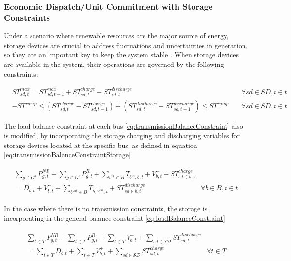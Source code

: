 \documentclass[12pt,LUDisStyle,twosided]{book}
\newcommand{\mc}{\mathcal}
\begin{document}
\subsubsection{Economic Dispatch/Unit Commitment with Storage Constraints}

Under a scenario where renewable resources are the major source of energy, storage devices are crucial to address fluctuations and uncertainties in generation, so they are an important key to keep the system stable \cite{dwyer}. When storage devices are available in the system, their operations are governed by the following constraints:

\begin{subequations}\label{model:storageConstraints}
\begin{alignat}{4}
& ST^{max}_{sd,t} = ST^{max}_{sd,t - 1} + ST^{charge}_{sd,t} - ST^{discharge}_{sd,t}  &~& \forall sd \in SD, t \in t \label{eq:storageLimits} \\
&  -ST^{ramp} \leq (ST^{charge}_{sd,t} - ST^{charge}_{sd,t-1}) + (ST^{discharge}_{sd,t} - ST^{discharge}_{sd,t-1}) \leq ST^{ramp}  &~& \forall sd \in SD, t \in t \label{eq:storageRamping}
\end{alignat} 
\end{subequations}

The load balance constraint at each bus \ref{eq:transmissionBalanceConstraint} also is modified, by incorporating the storage charging and discharging variables for storage devices located at the specific bus, as defined in equation \ref{eq:transmissionBalanceConstraintStorage}

\begin{subequations}
\begin{align}
\begin{split}
\sum_{g \in G^{b}} P^{NR}_{g,t} + \sum_{g \in G^{b}} P^{R}_{g,t} + \sum_{b^{in} \in B} T_{b^{in},b,t} + V^{-}_{b,t}  + ST^{charge}_{sd \in b,t} &
\\ = D_{b,t}  + V^{+}_{b,t} + \sum_{b^{out} \in B} T_{b,b^{out},t} + ST^{discharge}_{sd \in b,t}  & \forall b \in B, t \in t \label{eq:transmissionBalanceConstraintStorage}
\end{split}
\end{align} 
\end{subequations}

In the case where there is no transmission constraints, the storage is incorporating in the general balance constraint \ref{eq:loadBalanceConstraint}

\begin{subequations}
\begin{align}
\begin{split}
\sum_{t \in T} P^{NR}_{g,t} + \sum_{t \in T} P^{R}_{g,t} + \sum_{t \in T}V^{-}_{b,t} + \sum_{sd \in \mc{SD}} ST^{discharge}_{sd,t} &
\\ = \sum_{t \in T} D_{b,t}  + \sum_{t \in T}V^{+}_{b,t} + \sum_{sd \in \mc{SD}} ST^{charge}_{sd,t} & \forall t \in T  \label{eq:loadBalanceConstraintStorage}
\end{split}
\end{align} 
\end{subequations}
\end{document}
